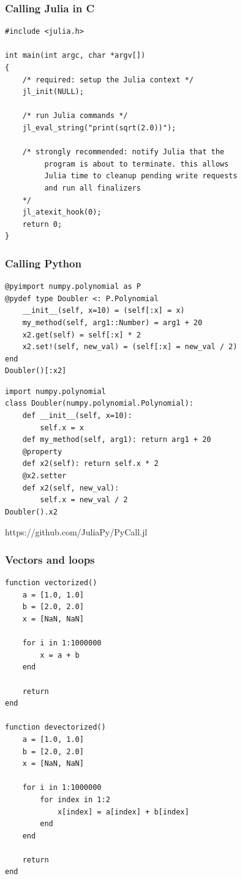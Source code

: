 \begin{frame}[fragile]
	\frametitle{Calling Julia in C}
  \begin{tiny}
  \begin{verbatim}
#include <julia.h>

int main(int argc, char *argv[])
{
    /* required: setup the Julia context */
    jl_init(NULL);

    /* run Julia commands */
    jl_eval_string("print(sqrt(2.0))");

    /* strongly recommended: notify Julia that the
         program is about to terminate. this allows
         Julia time to cleanup pending write requests
         and run all finalizers
    */
    jl_atexit_hook(0);
    return 0;
}
  \end{verbatim}
  \end{tiny}
\end{frame}

\begin{frame}[fragile]
	\frametitle{Calling Python}
  \begin{tiny}
  \begin{verbatim}
@pyimport numpy.polynomial as P
@pydef type Doubler <: P.Polynomial
    __init__(self, x=10) = (self[:x] = x)
    my_method(self, arg1::Number) = arg1 + 20
    x2.get(self) = self[:x] * 2
    x2.set!(self, new_val) = (self[:x] = new_val / 2)
end
Doubler()[:x2]
  \end{verbatim}
  \vspace{2.0mm}
  \begin{verbatim}
import numpy.polynomial
class Doubler(numpy.polynomial.Polynomial):
    def __init__(self, x=10):
        self.x = x
    def my_method(self, arg1): return arg1 + 20
    @property
    def x2(self): return self.x * 2
    @x2.setter
    def x2(self, new_val):
        self.x = new_val / 2
Doubler().x2
  \end{verbatim}
  \end{tiny}
  \vspace{5.0mm}
  https://github.com/JuliaPy/PyCall.jl
\end{frame}

\begin{frame}[fragile]
	\frametitle{Vectors and loops}
  \begin{tiny}
  \begin{verbatim}
function vectorized()
    a = [1.0, 1.0]
    b = [2.0, 2.0]
    x = [NaN, NaN]

    for i in 1:1000000
        x = a + b
    end

    return
end

function devectorized()
    a = [1.0, 1.0]
    b = [2.0, 2.0]
    x = [NaN, NaN]

    for i in 1:1000000
        for index in 1:2
            x[index] = a[index] + b[index]
        end
    end

    return
end
\end{verbatim}
\end{tiny}
\end{frame}

